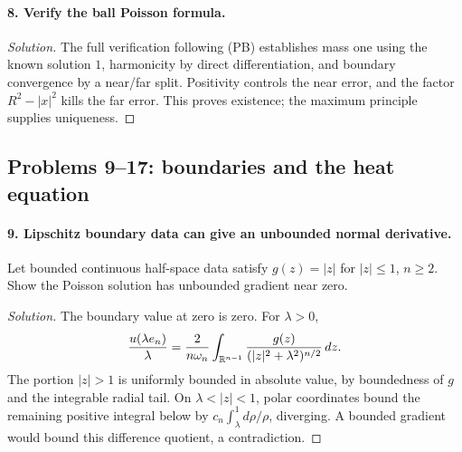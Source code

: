 \paragraph{8. Verify the ball Poisson formula.}
\begin{proof}[Solution]
The full verification following (PB) establishes mass one using the
known solution $1$, harmonicity by direct differentiation, and boundary
convergence by a near/far split. Positivity controls the near error,
and the factor $R^2-|x|^2$ kills the far error.
This proves existence; the maximum principle supplies uniqueness.
\end{proof}

\subsection{Problems 9--17: boundaries and the heat equation}
\paragraph{9. Lipschitz boundary data can give an unbounded normal derivative.}
Let bounded continuous half-space data satisfy $g(z)=|z|$ for $|z|\leq1$,
$n\geq2$. Show the Poisson solution has unbounded gradient near zero.
\begin{proof}[Solution]
The boundary value at zero is zero. For $\lambda>0$,
\[
 \frac{u(\lambda e_n)}{\lambda}
 =\frac2{n\omega_n}\int_{\mathbb{R}^{n-1}}
                \frac{g(z)}{(|z|^2+\lambda^2)^{n/2}}\,dz.
\]
The portion $|z|>1$ is uniformly bounded in absolute value, by boundedness
of $g$ and the integrable radial tail.
On $\lambda<|z|<1$, polar coordinates bound the remaining positive
integral below by $c_n\int_\lambda^1 d\rho/\rho$, diverging.
A bounded gradient would bound this difference quotient, a contradiction.
\end{proof}

